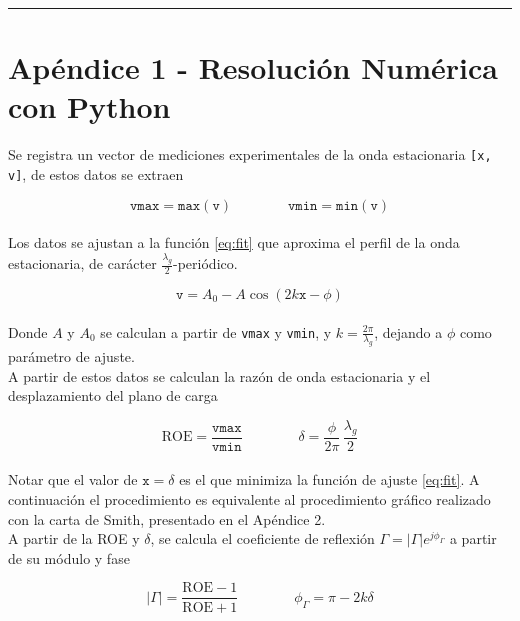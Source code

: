 \documentclass[11pt,a4paper]{article}
\begin{document}
\begin{appendices}
\vspace{-1em}
\hrule
\vspace{1em}
\normalsize
\section{Apéndice 1 - Resolución Numérica con Python}
\begin{multicols}{2}
    Se registra un vector de mediciones experimentales de la onda estacionaria \texttt{[x, v]}, de estos datos se extraen

    \begin{equation}
        \mathtt{vmax} = \mathtt{max(v)} \qquad \qquad \mathtt{vmin} = \mathtt{min(v)}
    \end{equation}\\[-1em]

    Los datos se ajustan a la función \ref{eq:fit} que aproxima el perfil de la onda estacionaria, de carácter $\frac{\lambda_g}{2}$-periódico.

    \begin{equation}\label{eq:fit}
        \mathtt v = A_0 -A\cos(2k\mathtt x-\phi)
    \end{equation}\\[-1em]

    Donde $A$ y $A_0$ se calculan a partir de \texttt{vmax} y \texttt{vmin}, y $k = \frac{2\pi}{\lambda_g}$, dejando a $\phi$ como parámetro de ajuste.\\

    A partir de estos datos se calculan la razón de onda estacionaria y el desplazamiento del plano de carga

    \begin{equation}
        \mathrm{ROE} = \frac{\mathtt{vmax}}{\mathtt{vmin}}\qquad\qquad\delta = \frac{\phi}{2\pi}\,\frac{\lambda_g}{2}
    \end{equation}\\[-1em]

    Notar que el valor de $\mathtt{x} = \delta$ es el que minimiza la función de ajuste \ref{eq:fit}. A continuación el procedimiento es equivalente al procedimiento gráfico realizado con la carta de Smith, presentado en el Apéndice 2.\\

    A partir de la ROE y $\delta$, se calcula el coeficiente de reflexión $\Gamma = \left|\Gamma\right|e^{j\phi_\Gamma}$ a partir de su módulo y fase

    \begin{equation}
        \left|\Gamma\right| = \frac{\mathrm{ROE}-1}{\mathrm{ROE}+1}\qquad\qquad \phi_\Gamma = \pi-2k\delta
    \end{equation}\\[-1em]


\end{multicols}
\end{appendices}
\end{document}
